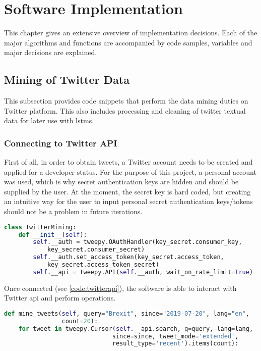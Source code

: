\section{Software Implementation}

    This chapter gives an extensive overview of implementation decisions. Each of the major algorithms and functions are accompanied by code samples, variables and major decisions are explained.
    
    \subsection{Mining of Twitter Data} \label{twitterdata}
        This subsection provides code snippets that perform the data mining duties on Twitter platform. This also includes processing and cleaning of twitter textual data for later use with \gls{lstm}s.
        
        \subsubsection{Connecting to Twitter API}
            First of all, in order to obtain tweets, a Twitter account needs to be created and applied for a developer status. For the purpose of this project, a personal account was used, which is why secret authentication keys are hidden and should be supplied by the user. At the moment, the secret key is hard coded, but creating an intuitive way for the user to input personal secret authentication keys/tokens should not be a problem in future iterations.
            
            \begin{lstlisting}[language=Python, caption=Connecting Twitter API, label=code:twitterapi]
class TwitterMining:
    def __init__(self):
        self.__auth = tweepy.OAuthHandler(key_secret.consumer_key, 
            key_secret.consumer_secret)
        self.__auth.set_access_token(key_secret.access_token, 
            key_secret.access_token_secret)
        self.__api = tweepy.API(self.__auth, wait_on_rate_limit=True)
            \end{lstlisting}
            
            Once connected (see \cref{code:twitterapi}), the software is able to interact with Twitter \gls{api} and perform operations.
            
            \begin{lstlisting}[language=Python, caption=Starting Data Mining, label=code:twitterstream]
def mine_tweets(self, query="Brexit", since="2019-07-20", lang="en", 
                count=20):
    for tweet in tweepy.Cursor(self.__api.search, q=query, lang=lang, 
                              since=since, tweet_mode='extended',
                              result_type='recent').items(count):
            \end{lstlisting}
            

